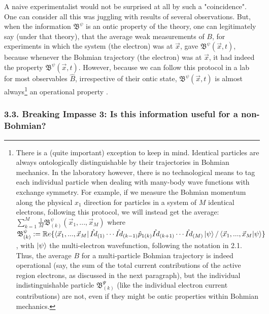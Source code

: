 \documentclass[11pt, a4paper]{article} %
\newcommand{\B}{\mathfrak{B}}
\begin{document}
A naive experimentalist would not be surprised at all by such a "coincidence". One can consider all this was juggling with results of several observations. But, when the information $\B^\psi$ is an ontic property of the theory, one can legitimately say (under that theory), that the average weak measurements of $B$, for experiments in which the system (the electron) was at $\vec{x}$, gave $\B^\psi(\vec{x},t)$, because whenever the Bohmian trajectory (the electron) was at $\vec{x}$, it had indeed the property $\B^\psi(\vec{x},t)$. However, because we can follow this protocol in a lab for most observables $\hat{B}$, irrespective of their ontic state, $\B^\psi(\vec{x},t)$ is almost always\footnote{There is a (quite important) exception to keep in mind. Identical particles are always ontologically distinguishable by their trajectories in Bohmian mechanics. In the laboratory however, there is no technological means to tag each individual particle when dealing with many-body wave functions with exchange symmetry. For example, if we measure the Bohmian momentum along the physical $x_1$ direction for particles in a system of $M$ identical electrons, following this protocol, we will instead get the average: $\sum_{k=1}^M \frac{1}{M}\B^\psi_{(k)}(\vec{x}_1,...,\vec{x}_M)$ where $\B^\psi_{(k)}:=\mathbb{R}e\{\bra{\vec{x}_1,...,\vec{x}_M}\hat{Id}_{(1)}\cdots\hat{Id}_{(k-1)}\hat{p}_{1(k)}\hat{Id}_{(k+1)}\cdots\hat{Id}_{(M)}\ket{\psi}/\bra{\vec{x}_1,...,\vec{x}_M}\ket{\psi}\}$, with $\ket{\psi}$ the multi-electron wavefunction, following the notation in 2.1. Thus, the average $B$ for a multi-particle Bohmian trajectory is indeed operational (say, the sum of the total current contributions of the active region electrons, as discussed in the next paragraph), but the individual indistinguishable particle $\B^\Psi_{(k)}$ (like the individual electron current contributions) are not, even if they might be ontic properties within Bohmian mechanics.} an operational property \cite{DevInPosition1, DevInPosition2}.



\subsubsection*{3.3. Breaking Impasse 3: Is this information useful for a non-Bohmian?}
\vspace{-0.15cm}
\end{document}
